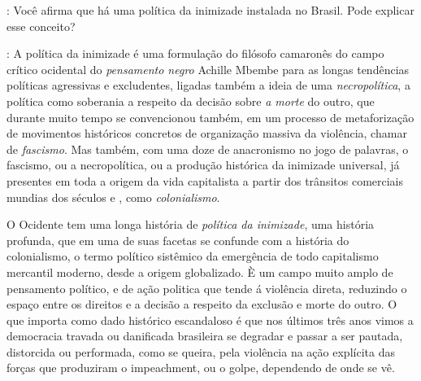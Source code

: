\noindent{}: Você afirma que há uma política da inimizade instalada no Brasil. Pode
explicar esse conceito?

\medskip

\noindent{}: A política da inimizade é uma formulação do filósofo camaronês do campo
crítico ocidental do \emph{pensamento negro} Achille Mbembe para as
longas tendências políticas agressivas e excludentes, ligadas também a
ideia de uma \emph{necropolítica}, a política como soberania a respeito
da decisão sobre \emph{a morte} do outro, que durante muito tempo se
convencionou também, em um processo de metaforização de movimentos
históricos concretos de organização massiva da violência, chamar de
\emph{fascismo}. Mas também, com uma doze de anacronismo no jogo de
palavras, o fascismo, ou a necropolítica, ou a produção histórica da
inimizade universal, já presentes em toda a origem da vida capitalista a
partir dos trânsitos comerciais mundias dos séculos  e , como
\emph{colonialismo}.

O Ocidente tem uma longa história de \emph{política da inimizade}, uma
história profunda, que em uma de suas facetas se confunde com a história
do colonialismo, o termo político sistêmico da emergência de todo
capitalismo mercantil moderno, desde a origem globalizado. È um campo
muito amplo de pensamento político, e de ação politica que tende á
violência direta, reduzindo o espaço entre os direitos e a decisão a
respeito da exclusão e morte do outro. O que importa como dado histórico
escandaloso é que nos últimos três anos vimos a democracia travada ou
danificada brasileira se degradar e passar a ser pautada, distorcida ou
performada, como se queira, pela violência na ação explícita das forças
que produziram o impeachment, ou o golpe, dependendo de onde se vê.

